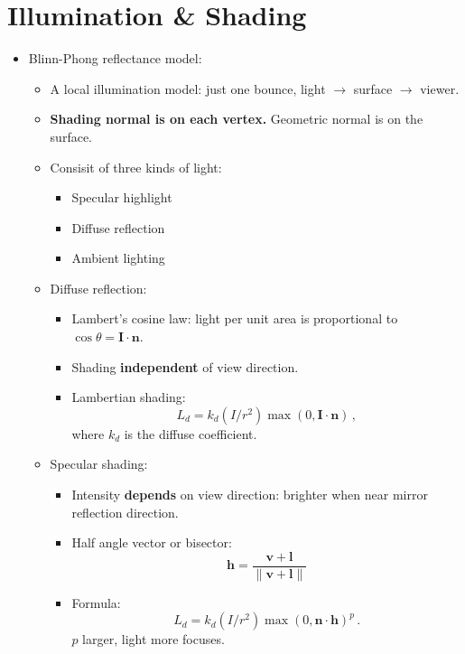\documentclass{article}
\begin{document}
\section{Illumination \& Shading}
\begin{itemize}
    \item Blinn-Phong reflectance model:
    \begin{itemize}
        \item A local illumination model: just one bounce, light $\rightarrow$ surface $\rightarrow$ viewer.
         \item \textbf{Shading normal is on each vertex. }Geometric normal is on the surface.
        \item Consisit of three kinds of light:
        
        \begin{itemize}
            \item Specular highlight
            \item Diffuse reflection
            \item Ambient lighting
        \end{itemize}
       
        
        \item Diffuse reflection:
        \begin{itemize}
            \item Lambert's cosine law: light per unit area is proportional to $\cos \theta = \mathbf{I} \cdot \mathbf{n}$.
            \item Shading \textbf{independent} of view direction.
            \item Lambertian shading: $$L_d=k_d(I/r^2)\max(0,\mathbf{I} \cdot \mathbf{n})\,,$$where $k_d$ is the diffuse coefficient.
        \end{itemize}
        
        \item Specular shading:
        \begin{itemize}
            \item Intensity \textbf{depends} on view direction: brighter when near mirror reflection direction.
            \item Half angle vector or bisector:
            $$
            \mathbf{h}=\frac{\mathbf{v}+\mathbf{l}}{\|\mathbf{v}+\mathbf{l}\|}
            $$
            \item Formula:
            $$
            L_d=k_d(I/r^2)\max(0,\mathbf{n} \cdot \mathbf{h})^p\,.
            $$
            $p$ larger, light more focuses.
        \end{itemize}
        

\end{itemize}
\end{itemize}
\end{document}
